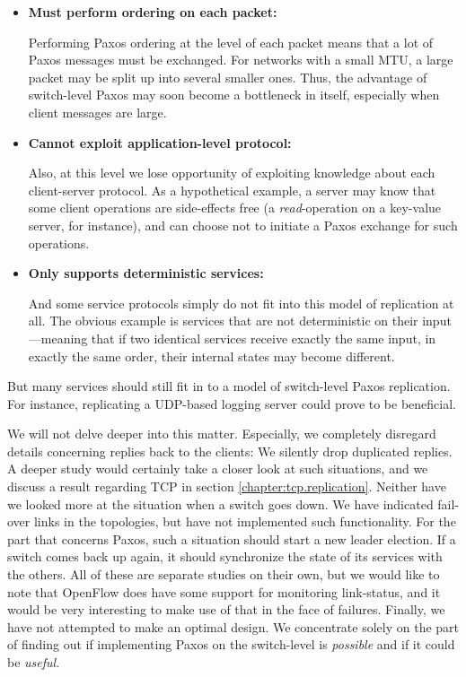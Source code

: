 \begin{itemize}
  \item \textbf{Must perform ordering on each packet:}

Performing Paxos ordering at the level of each packet means that a lot of
Paxos messages must be exchanged.  For networks with a small \ac{MTU}, a
large packet may be split up into several smaller ones.  Thus, the advantage
of switch-level Paxos may soon become a bottleneck in itself, especially
when client messages are large.

  \item \textbf{Cannot exploit application-level protocol:}

Also, at this level we lose opportunity of exploiting knowledge about
each client-server protocol.  As a hypothetical example, a server may know
that some client operations are side-effects free (a
\textit{read}-operation on a key-value server, for instance), and can
choose not to initiate a Paxos exchange for such operations.

  \item \textbf{Only supports deterministic services:}

And some service protocols simply do not fit into this model
of replication at all.  The obvious example is services that are not
deterministic on their input---meaning that if two identical services 
receive exactly the same input, in exactly the same order, their internal
states may become different.

\end{itemize}

But many services should still fit in to a model of switch-level
Paxos replication.  For instance, replicating a \acs{UDP}-based logging
server could prove to be beneficial.

We will not delve deeper into this matter.  Especially, we completely
disregard details concerning replies back to the clients: We silently
drop duplicated replies.  A deeper study would certainly take a closer
look at such situations, and we discuss a result regarding TCP in section
\ref{chapter:tcp.replication}.
%
Neither have we looked more at the situation when a switch goes down.
We have indicated fail-over links in the topologies, but have not
implemented such functionality.  For the part that concerns Paxos, such a
situation should start a new leader election.  If a switch comes back up
again, it should synchronize the state of its services with the others.
All of these are separate studies on their own, but we would like to note
that OpenFlow does have some support for monitoring link-status, and it
would be very interesting to make use of that in the face of failures.
%
Finally, we have not attempted to make an optimal design.  We concentrate
solely on the part of finding out if implementing Paxos on the switch-level
is \textit{possible} and if it could be \textit{useful}.

